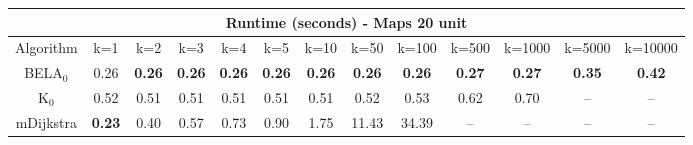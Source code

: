\begin{tabular}{c|cccccccccccc}\toprule
\multicolumn{13}{c}{Runtime (seconds) - Maps 20 unit}\\ \midrule
Algorithm & k=1 & k=2 & k=3 & k=4 & k=5 & k=10 & k=50 & k=100 & k=500 & k=1000 & k=5000 & k=10000 \\ \midrule
BELA$_0$ & 0.26 & \textbf{0.26} & \textbf{0.26} & \textbf{0.26} & \textbf{0.26} & \textbf{0.26} & \textbf{0.26} & \textbf{0.26} & \textbf{0.27} & \textbf{0.27} & \textbf{0.35} & \textbf{0.42} \\
K$_0$ & 0.52 & 0.51 & 0.51 & 0.51 & 0.51 & 0.51 & 0.52 & 0.53 & 0.62 & 0.70 & -- & -- \\
mDijkstra & \textbf{0.23} & 0.40 & 0.57 & 0.73 & 0.90 & 1.75 & 11.43 & 34.39 & -- & -- & -- & -- \\ \bottomrule 
\end{tabular}
